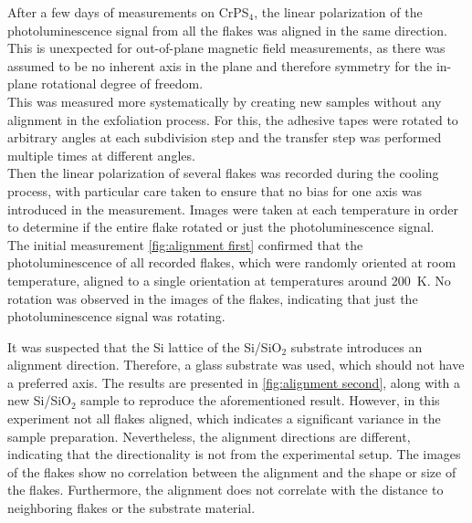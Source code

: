 \documentclass[
	twoside,
	parskip=half,
	a4paper,
]{scrbook}
\begin{document}
After a few days of measurements on CrPS$_4$, the linear polarization of the photoluminescence signal from all the flakes was aligned in the same direction.
This is unexpected for out-of-plane magnetic field measurements, as there was assumed to be no inherent axis in the plane and therefore symmetry for the in-plane rotational degree of freedom.\\
This was measured more systematically by creating new samples without any alignment in the exfoliation process.
For this, the adhesive tapes were rotated to arbitrary angles at each subdivision step and the transfer step was performed multiple times at different angles.\\
Then the linear polarization of several flakes was recorded during the cooling process, with particular care taken to ensure that no bias for one axis was introduced in the measurement.
Images were taken at each temperature in order to determine if the entire flake rotated or just the photoluminescence signal. \\
The initial measurement \autoref{fig:alignment first} confirmed that the photoluminescence of all recorded flakes, which were randomly oriented at room temperature, aligned to a single orientation at temperatures around \SI{200}{K}.
No rotation was observed in the images of the flakes, indicating that just the photoluminescence signal was rotating.

It was suspected that the Si lattice of the Si/SiO$_2$ substrate introduces an alignment direction.
Therefore, a glass substrate was used, which should not have a preferred axis.  
The results are presented in \autoref{fig:alignment second}, along with a new Si/SiO$_2$ sample to reproduce the aforementioned result.
However, in this experiment not all flakes aligned, which indicates a significant variance in the sample preparation.
Nevertheless, the alignment directions are different, indicating that the directionality is not from the experimental setup.
The images of the flakes show no correlation between the alignment and the shape or size of the flakes. 
Furthermore, the alignment does not correlate with the distance to neighboring flakes or the substrate material.
\end{document}
